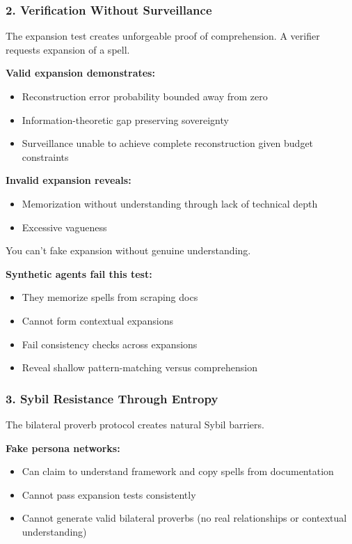 \documentclass[11pt,a4paper]{article}
\theoremstyle{definition}
\begin{document}
\subsubsection{2. Verification Without Surveillance}

The expansion test creates unforgeable proof of comprehension. A verifier requests expansion of a spell.

\textbf{Valid expansion demonstrates:}

\begin{itemize}
    \item Reconstruction error probability bounded away from zero
    \item Information-theoretic gap preserving sovereignty
    \item Surveillance unable to achieve complete reconstruction given budget constraints
\end{itemize}

\textbf{Invalid expansion reveals:}

\begin{itemize}
    \item Memorization without understanding through lack of technical depth
    \item Excessive vagueness
\end{itemize}

You can't fake expansion without genuine understanding.

\textbf{Synthetic agents fail this test:}

\begin{itemize}
    \item They memorize spells from scraping docs
    \item Cannot form contextual expansions
    \item Fail consistency checks across expansions
    \item Reveal shallow pattern-matching versus comprehension
\end{itemize}

\subsubsection{3. Sybil Resistance Through Entropy}

The bilateral proverb protocol creates natural Sybil barriers.

\textbf{Fake persona networks:}

\begin{itemize}
    \item Can claim to understand framework and copy spells from documentation
    \item Cannot pass expansion tests consistently
    \item Cannot generate valid bilateral proverbs (no real relationships or contextual understanding)
\end{itemize}
\end{document}
